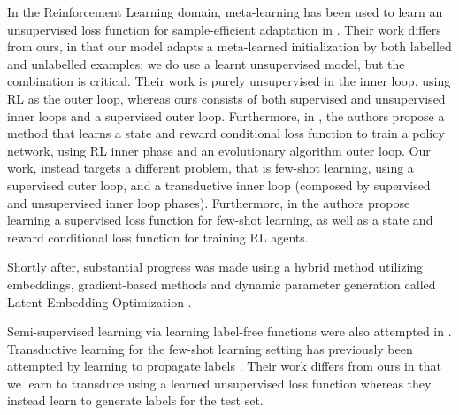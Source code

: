 \documentclass{article} \usepackage[dvipsnames]{xcolor}
\begin{document}
In the Reinforcement Learning domain, meta-learning has been used to learn an unsupervised loss function for sample-efficient adaptation in \citep{yu2018towards}. Their work differs from ours, in that our model adapts a meta-learned initialization by both labelled and unlabelled examples; we do use a learnt unsupervised model, but the combination is critical. Their work is purely unsupervised in the inner loop, using RL as the outer loop, whereas ours consists of both supervised and unsupervised inner loops and a supervised outer loop. Furthermore, in \citep{houthooft2018evolved}, the authors propose a method that learns a state and reward conditional loss function to train a policy network, using RL inner phase and an evolutionary algorithm outer loop. Our work, instead targets a different problem, that is few-shot learning, using a supervised outer loop, and a transductive inner loop (composed by supervised and unsupervised inner loop phases). Furthermore, in \citep{floodcritic2017} the authors propose learning a supervised loss function for few-shot learning, as well as a state and reward conditional loss function for training RL agents.

Shortly after, substantial progress was made using a hybrid method utilizing embeddings, gradient-based methods and dynamic parameter generation called Latent Embedding Optimization \cite{rusu2018meta}. 

Semi-supervised learning via learning label-free functions were also attempted in \cite{semifewmaml2018}. Transductive learning for the few-shot learning setting has previously been attempted by learning to propagate labels \citep{liu2018transductive}. Their work differs from ours in that we learn to transduce using a learned unsupervised loss function whereas they instead learn to generate labels for the test set.
\end{document}
